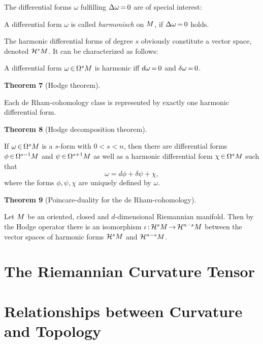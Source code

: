 \documentclass[11pt,twoside]{article}
\begin{document}
The differential forms $\omega$ fulfilling $\Delta \omega {\,=\,} 0$
are of special interest:

\begin{definition}
A differential form $\omega$ is called \textit{harmonisch} on ${M}$,
if $\Delta \omega {\,=\,} 0$ holds.
\end{definition}

The harmonic differential forms of degree $s$ obviously constitute
a vector space, denoted ${\mathcal{H}}^s {M}$.
It can be characterized as follows:

\begin{lemma}
A differential form $\omega {\,\in\,} \Omega^s {M}$ is harmonic
iff $d \omega {\,=\,} 0$ and $\delta \omega {\,=\,} 0$.
\end{lemma}

{\bf Theorem 7} (Hodge theorem).
\begin{theorem}
Each de Rham-cohomology class is represented by exactly one
harmonic differential form.
\end{theorem}

{\bf Theorem 8} (Hodge decomposition theorem).
\begin{theorem}
If $\omega {\,\in\,} \Omega^s {M}$ is a $s$-form with $0 < s < n$,
then there are differential forms $\phi {\,\in\,} \Omega^{s-1} {M}$ and
$\psi {\,\in\,} \Omega^{s+1} {M}$
as well as a harmonic differential form $\chi {\,\in\,} \Omega^s {M}$
such that
\[
\omega = d \phi + \delta \psi + \chi,
\]
where the forms $\phi, \psi, \chi$ are uniquely defined by $\omega$.
\end{theorem}

{\bf Theorem 9} (Poincare-duality for the de Rham-cohomology).
\begin{theorem}
Let ${M}$ be an oriented, closed and $d$-dimensional Riemannian manifold.
Then by the Hodge operator there is an isomorphism
$\iota{\,:\,}{\mathcal{H}}^s {M} {\,\to\,} {\mathcal{H}}^{n-s} {M}$
between the vector spaces of harmonic forms ${\mathcal{H}}^s {M}$ and
${\mathcal{H}}^{n-s} {M}$.
\end{theorem}

\section{The Riemannian Curvature Tensor}

\section{Relationships between Curvature and Topology}
\end{document}
